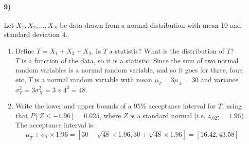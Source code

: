 \documentclass[12pt]{article}
\numberwithin{equation}{section}
\numberwithin{figure}{section}
\numberwithin{table}{section}
\begin{document}
\paragraph{9)} Let $X_1,X_2,...,X_N$ be data drawn from a normal distribution with mean $10$ and standard deviation $4$.
\begin{enumerate}
\item Define $T = X_1+X_2+X_3$. Is $T$ a statistic? What is the distribution of $T$? \\
{\color{blue} $T$ is a function of the data, so it is a statistic. Since the sum of two normal random variables is a normal random variable, and so it goes for three, four, etc, $T$ is a normal random variable with mean $\mu_{T}=3\mu_{X}=30$ and variance $\sigma^2_{T}=3\sigma^2_{X}=3\times 4^2=48$.}
\item Write the lower and upper bounds of a 95\% acceptance interval for $T$, using that $P[Z\leq-1.96]=0.025$, where $Z$ is a standard normal (i.e. $z_{.025}=1.96$). \\
{\color{blue} The acceptance interval is:
  \[\mu_{T}\pm\sigma_{T}\times1.96 = [30-\sqrt{48}\times1.96,30+\sqrt{48}\times1.96] = [16.42,43.58]\]}
\end{enumerate}
\end{document}
